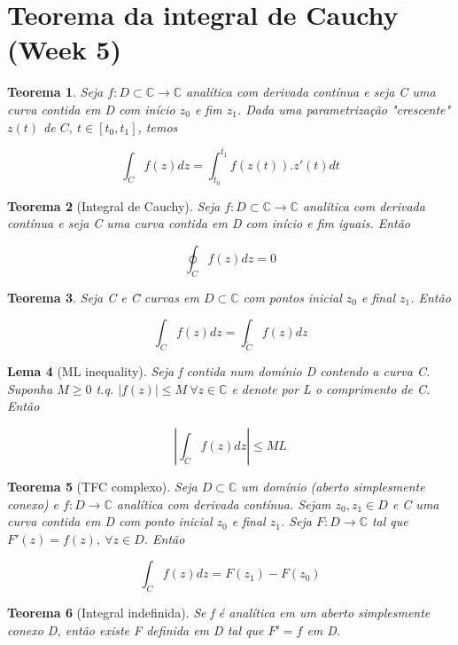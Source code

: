 \documentclass{article}
\newtheorem{theorem}{Teorema}
\newtheorem{lemma}[theorem]{Lema}
\begin{document}
\section*{Teorema da integral de Cauchy (Week 5)}
\label{s5}
\begin{theorem}
Seja $f: D \subset \mathbb{C} \to \mathbb{C}$ analítica com derivada contínua e seja C uma curva contida em D com início $z_0$ e fim $z_1$. Dada uma parametrização "crescente" $z(t)$ de $C,\ t \in [t_0, t_1]$, temos

$$\int_C f(z) d z = \int_{t_0}^{t_1} f(z(t)) . z'(t) d t$$
\end{theorem}

\begin{theorem}[Integral de Cauchy]
Seja $f: D \subset \mathbb{C} \to \mathbb{C}$ analítica com derivada contínua e seja C uma curva contida em D com início e fim iguais. Então

$$\oint_C f(z) d z = 0$$
\end{theorem}

\begin{theorem}
Seja C e \~C curvas em $D \subset \mathbb{C}$ com pontos inicial $z_0$ e final $z_1$. Então

$$\int_C f(z) d z = \int_{\tilde{C}} f(z) d z$$
\end{theorem}

\begin{lemma}[ML inequality]
Seja f contida num domínio D contendo a curva C. Suponha $M \geq 0$ t.q. $| f(z) | \leq M\ \forall z \in \mathbb{C}$ e denote por L o comprimento de C. Então

$$\left | \int_C f(z) d z \right | \leq M L$$
\end{lemma}

\begin{theorem}[TFC complexo]
Seja $D \subset \mathbb{C}$ um domínio (aberto simplesmente conexo) e $f: D \rightarrow \mathbb{C}$ analítica com derivada contínua. Sejam $z_0, z_1 \in D$ e C uma curva contida em D com ponto inicial $z_0$ e final $z_1$. Seja $F: D \rightarrow \mathbb{C}$ tal que $F'(z) = f(z),\ \forall z \in D$. Então

$$\int_C f(z) d z = F(z_1) - F(z_0)$$
\end{theorem}

\begin{theorem}[Integral indefinida]
Se f é analítica em um aberto simplesmente conexo D, então existe F definida em D tal que $F' = f$ em D.
\end{theorem}
\end{document}
